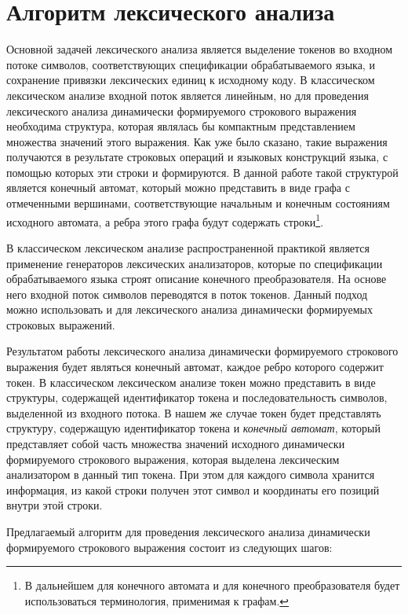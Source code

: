 \documentclass{matmex-diploma}
\begin{document}
\section{Алгоритм лексического анализа}

Основной задачей лексического анализа является выделение токенов во входном потоке символов, соответствующих спецификации обрабатываемого языка, и сохранение привязки лексических единиц к исходному коду. В классическом лексическом анализе входной поток является линейным, но для проведения лексического анализа динамически формируемого строкового выражения необходима структура, которая являлась бы компактным представлением множества значений этого выражения. Как уже было сказано, такие выражения получаются в результате строковых операций и языковых конструкций языка, с помощью которых эти строки и формируются. В данной работе такой структурой является конечный автомат, который можно представить в виде графа с отмеченными вершинами, соответствующие начальным и конечным состояниям исходного автомата, а ребра этого графа будут содержать строки\footnote{В дальнейшем для конечного автомата и для конечного преобразователя будет использоваться терминология, применимая к графам.}. 

В классическом лексическом анализе распространенной практикой является применение генераторов лексических анализаторов, которые по спецификации обрабатываемого языка строят описание конечного преобразователя. На основе него входной поток символов переводятся в поток токенов. Данный подход можно использовать и для лексического анализа динамически формируемых строковых выражений. 

Результатом работы лексического анализа динамически формируемого строкового выражения будет являться конечный автомат, каждое ребро которого содержит токен. В классическом лексическом анализе токен можно представить в виде структуры, содержащей идентификатор токена и последовательность символов, выделенной из входного потока. В нашем же случае токен будет представлять структуру, содержащую идентификатор токена  и \textit{конечный автомат}, который представляет собой часть множества значений исходного динамически формируемого строкового выражения, которая выделена лексическим анализатором в данный тип токена. При этом для каждого символа хранится информация, из какой строки получен этот символ и координаты его позиций внутри этой строки. 

Предлагаемый алгоритм для проведения лексического анализа динамически формируемого строкового выражения состоит из следующих шагов:
\end{document}

